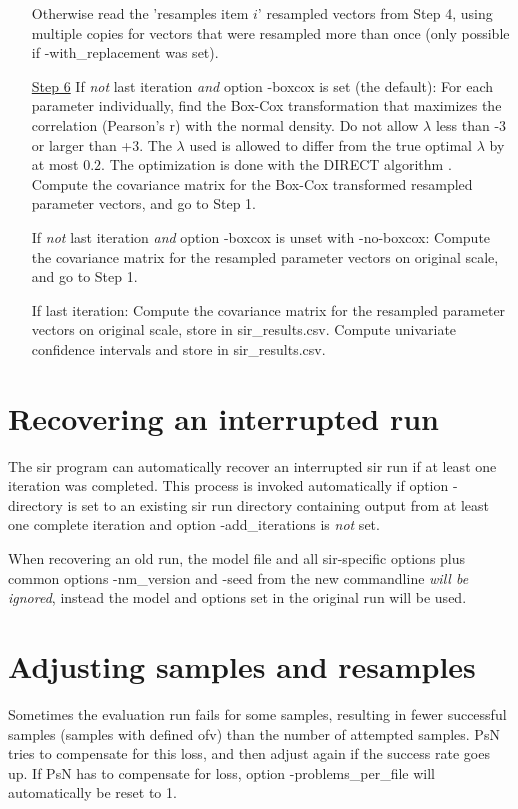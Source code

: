 \begin{itemize}
\noindent Otherwise read the 'resamples item $i$' resampled vectors from Step 4, using multiple copies for vectors that were 
resampled more than once (only possible if -with\_replacement was set). 
\item[\underline{Step 6}]
If \emph{not} last iteration \emph{and} option -boxcox is set (the default): 
For each parameter individually, find the Box-Cox transformation that maximizes the correlation (Pearson's r) with the normal density.
Do not allow $\lambda$ less than -3 or larger than +3. The  $\lambda$ used is allowed to differ from the true optimal  $\lambda$
by at most $0.2$. The optimization is done with the DIRECT algorithm \cite{direct}.
Compute the covariance matrix for the Box-Cox transformed resampled parameter vectors, and go to Step 1.

\noindent If \emph{not} last iteration \emph{and} option -boxcox is unset with -no-boxcox: 
Compute the covariance matrix for the resampled parameter vectors on original scale, and go to Step 1.

\noindent If last iteration: 
Compute the covariance matrix for the resampled parameter vectors on original scale, 
store in sir\_results.csv. 
Compute univariate confidence intervals and store in sir\_results.csv.
\end{itemize}

\section{Recovering an interrupted run}
The sir program can automatically recover an interrupted sir run
if at least one iteration was completed. This process is invoked automatically
if option -directory is set to an existing sir run directory containing output from
at least one complete iteration and option -add\_iterations is \emph{not} set.

When recovering an old run, the model file and all sir-specific options plus common options 
-nm\_version and -seed from
the new commandline \emph{will be ignored}, instead the model and options
set in the original run will be used.

\section{Adjusting samples and resamples}
Sometimes the evaluation run fails for some samples, resulting in fewer successful samples (samples with defined ofv)
than the number of attempted samples. PsN tries to compensate for this loss, and then
adjust again if the success rate goes up. If PsN has to compensate for loss, option -problems\_per\_file will 
automatically be reset to 1.
